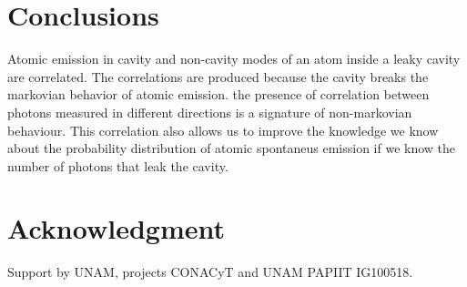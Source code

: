 \documentclass[conference]{IEEEtran}
\begin{document}


\section{Conclusions}\label{sc:conclusions}

Atomic emission in cavity and non-cavity modes of an atom inside a
leaky cavity are correlated. The correlations are produced because the
cavity breaks the markovian behavior of atomic emission. the presence
of correlation between photons measured in different directions is a
signature of non-markovian behaviour. This correlation also allows us
to improve the knowledge we know about the probability distribution of
atomic spontaneus emission if we know the number of photons that leak
the cavity. 



\section*{Acknowledgment}

Support by UNAM, projects CONACyT and UNAM PAPIIT IG100518.




\end{document}
